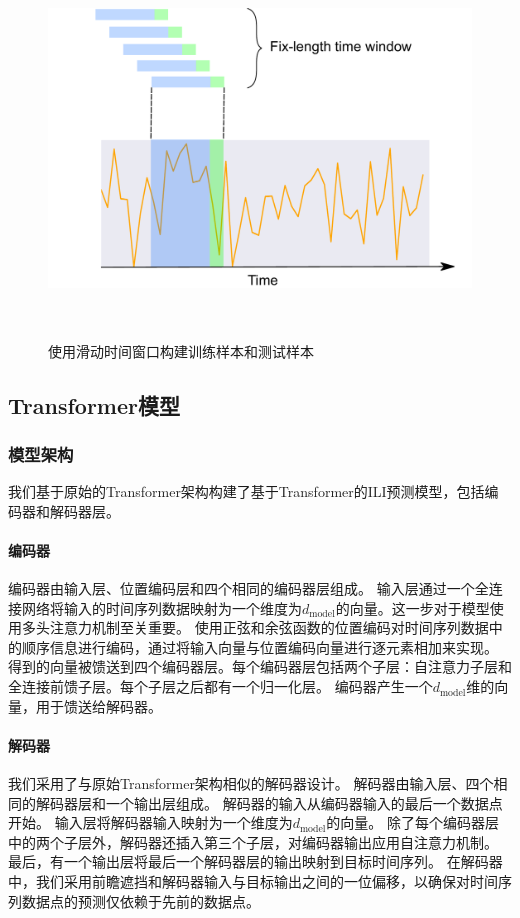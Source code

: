 \begin{figure}
\centering
\includegraphics[width=16cm,height=10cm,keepaspectratio]{sliding_window.pdf}
\caption{使用滑动时间窗口构建训练样本和测试样本}
\label{fig:sliding-window}
\end{figure}
    
    \subsection{Transformer模型}
    \subsubsection{模型架构}
    我们基于原始的Transformer架构构建了基于Transformer的ILI预测模型，包括编码器和解码器层。
    
    \paragraph*{编码器}
    编码器由输入层、位置编码层和四个相同的编码器层组成。
    输入层通过一个全连接网络将输入的时间序列数据映射为一个维度为$d_{\text{model}}$的向量。这一步对于模型使用多头注意力机制至关重要。
    使用正弦和余弦函数的位置编码对时间序列数据中的顺序信息进行编码，通过将输入向量与位置编码向量进行逐元素相加来实现。
    得到的向量被馈送到四个编码器层。每个编码器层包括两个子层：自注意力子层和全连接前馈子层。每个子层之后都有一个归一化层。
    编码器产生一个$d_{\text{model}}$维的向量，用于馈送给解码器。

\paragraph*{解码器}
我们采用了与原始Transformer架构相似的解码器设计。
解码器由输入层、四个相同的解码器层和一个输出层组成。
解码器的输入从编码器输入的最后一个数据点开始。
输入层将解码器输入映射为一个维度为$d_{\text{model}}$的向量。
除了每个编码器层中的两个子层外，解码器还插入第三个子层，对编码器输出应用自注意力机制。
最后，有一个输出层将最后一个解码器层的输出映射到目标时间序列。
在解码器中，我们采用前瞻遮挡和解码器输入与目标输出之间的一位偏移，以确保对时间序列数据点的预测仅依赖于先前的数据点。

